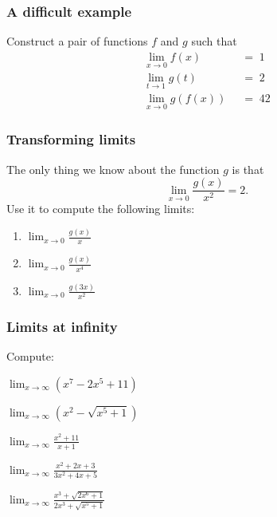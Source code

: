 \documentclass[14pt]{beamer}
\begin{document}
\begin{frame}
	\frametitle{A difficult example}

	Construct a pair of functions $f$ and $g$ such that
	\begin{align*}
		\lim_{x \to 0}f(x) \;    & \; = \; 1  \\
		\lim_{t \to 1}g(t) \;    & \; = \; 2  \\
		\lim_{x \to 0}g(f(x)) \; & \; = \; 42
	\end{align*}
\end{frame}

\begin{frame}
	\frametitle{Transforming limits}

	The only thing we know about the function $g$ is that
	\[
		\lim_{x \to 0}\frac{g(x)}{x^{2}}= 2.
	\]
	Use it to compute the following limits:

	\begin{multicols}{2}
		\begin{enumerate}
			\item $\displaystyle \lim_{x \to 0}\frac{g(x)}{x}$

			\item $\displaystyle \lim_{x \to 0}\frac{g(x)}{x^{4}}$

			\item $\displaystyle \lim_{x \to 0}\frac{g(3x)}{x^{2}}$
		\end{enumerate}
	\end{multicols}
\end{frame}

\begin{frame}
	\frametitle{Limits at infinity}

	Compute:

	\begin{enumerate}
	\end{enumerate}
\end{frame}
\end{document}
